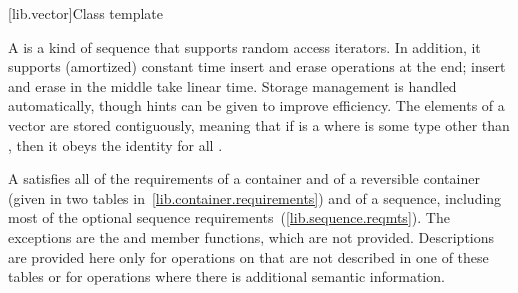 [lib.vector]{Class template }

\pnum
{}%
A
is a kind of sequence that supports random access iterators.
In addition, it supports (amortized) constant time insert and erase operations at the end;
insert and erase in the middle take linear time.
Storage management is handled automatically, though hints can be given
to improve efficiency.
The elements of a vector are stored contiguously, meaning that if
is a
where
is some type other than
,
then it obeys the identity
for all
.

\pnum
A  satisfies all of the requirements of a container and of a
reversible container (given in two tables in~\ref{lib.container.requirements})
and of a sequence, including most of the optional sequence
requirements~(\ref{lib.sequence.reqmts}). The exceptions are the
 and  member functions, which are not
provided. Descriptions are provided here only for operations on 
that are not described in one of these tables or for operations where there is
additional semantic information.

